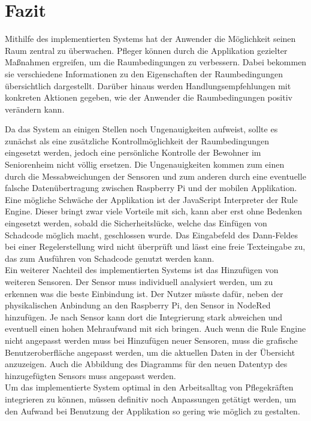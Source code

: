\chapter{Fazit}

Mithilfe des implementierten Systems hat der Anwender die Möglichkeit seinen Raum zentral zu überwachen. Pfleger können durch die Applikation gezielter Maßnahmen ergreifen, um die Raumbedingungen zu verbessern. Dabei bekommen sie verschiedene Informationen zu den Eigenschaften der Raumbedingungen übersichtlich dargestellt. Darüber hinaus werden Handlungsempfehlungen mit konkreten Aktionen gegeben, wie der Anwender die Raumbedingungen positiv verändern kann. 
 
Da das System an einigen Stellen noch Ungenauigkeiten aufweist, sollte es zunächst als eine zusätzliche Kontrollmöglichkeit der Raumbedingungen eingesetzt werden, jedoch eine persönliche Kontrolle der Bewohner im Seniorenheim nicht völlig ersetzen. Die Ungenauigkeiten kommen zum einen durch die Messabweichungen der Sensoren und zum anderen durch eine eventuelle falsche Datenübertragung zwischen Raspberry Pi und der mobilen Applikation. \\
Eine mögliche Schwäche der Applikation ist der JavaScript Interpreter der Rule Engine. Dieser bringt zwar viele Vorteile mit sich, kann aber erst ohne Bedenken eingesetzt werden, sobald die Sicherheitslücke, welche das Einfügen von Schadcode möglich macht, geschlossen wurde. Das Eingabefeld des Dann-Feldes bei einer Regelerstellung wird nicht überprüft und lässt eine freie Texteingabe zu, das zum Ausführen von Schadcode genutzt werden kann.\\
Ein weiterer Nachteil des implementierten Systems ist das Hinzufügen von weiteren Sensoren. Der Sensor muss individuell analysiert werden, um zu erkennen was die beste Einbindung ist. Der Nutzer müsste dafür, neben der physikalischen Anbindung an den Raspberry Pi, den Sensor in NodeRed hinzufügen. Je nach Sensor kann dort die Integrierung stark abweichen und eventuell einen hohen Mehraufwand mit sich bringen. Auch wenn die Rule Engine nicht angepasst werden muss bei Hinzufügen neuer Sensoren, muss die grafische Benutzeroberfläche angepasst werden, um die aktuellen Daten in der Übersicht anzuzeigen. Auch die Abbildung des Diagramms für den neuen Datentyp des hinzugefügten Sensors muss angepasst werden.\\
Um das implementierte System optimal in den Arbeitsalltag von Pflegekräften integrieren zu können, müssen definitiv noch Anpassungen getätigt werden, um den Aufwand bei Benutzung der Applikation so gering wie möglich zu gestalten. 
